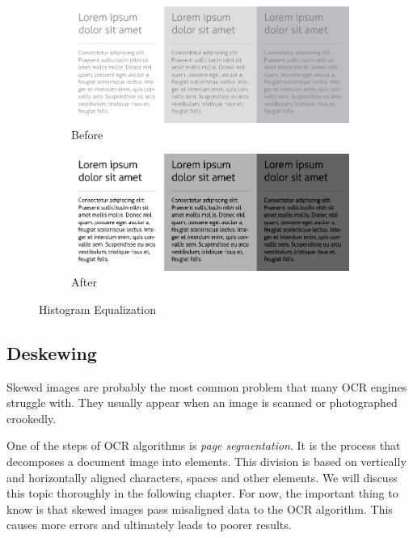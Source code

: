 \begin{figure}[H]
\centering
\hspace*{\fill} %
\begin{subfigure}{0.31\textwidth}
\includegraphics[width=\linewidth]{img/contrast_low.png}
\caption{Before} \label{fig:1a}
\end{subfigure}
\hspace*{\fill} %
\begin{subfigure}{0.31\textwidth}
\includegraphics[width=\linewidth]{img/contrast_high.png}
\caption{After}
\end{subfigure}
\caption{Histogram Equalization}
\end{figure}


\subsection{Deskewing}

Skewed images are probably the most common problem that many OCR engines struggle with. They usually appear when an image is scanned or photographed crookedly. 

One of the steps of OCR algorithms is \emph{page segmentation}. It is the process that decomposes a document image into elements. This division is based on vertically and horizontally aligned characters, spaces and other elements. We will discuss this topic thoroughly in the following chapter. For now, the important thing to know is that skewed images pass misaligned data to the OCR algorithm. This causes more errors and ultimately leads to poorer results.

